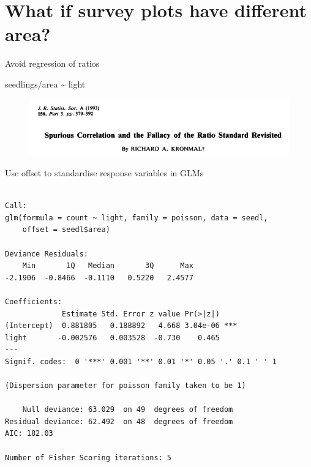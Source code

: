 \documentclass[10pt,ignorenonframetext,]{beamer}
\newenvironment{Shaded}{\begin{snugshade}}{\end{snugshade}}
\newcommand{\KeywordTok}[1]{\textcolor[rgb]{0.13,0.29,0.53}{\textbf{{#1}}}}
\newcommand{\DataTypeTok}[1]{\textcolor[rgb]{0.13,0.29,0.53}{{#1}}}
\newcommand{\StringTok}[1]{\textcolor[rgb]{0.31,0.60,0.02}{{#1}}}
\newcommand{\NormalTok}[1]{{#1}}
\begin{document}
\section{What if survey plots have different
area?}\label{what-if-survey-plots-have-different-area}

\begin{frame}{Avoid regression of ratios}

seedlings/area \textasciitilde{} light

\begin{figure}[htbp]
\centering
\includegraphics{images/ratios.PNG}
\caption{}
\end{figure}

\end{frame}

\begin{frame}[fragile]{Use offset to standardise response variables in
GLMs}

\begin{Shaded}
\end{Shaded}

\begin{verbatim}

Call:
glm(formula = count ~ light, family = poisson, data = seedl, 
    offset = seedl$area)

Deviance Residuals: 
    Min       1Q   Median       3Q      Max  
-2.1906  -0.8466  -0.1110   0.5220   2.4577  

Coefficients:
             Estimate Std. Error z value Pr(>|z|)    
(Intercept)  0.881805   0.188892   4.668 3.04e-06 ***
light       -0.002576   0.003528  -0.730    0.465    
---
Signif. codes:  0 '***' 0.001 '**' 0.01 '*' 0.05 '.' 0.1 ' ' 1

(Dispersion parameter for poisson family taken to be 1)

    Null deviance: 63.029  on 49  degrees of freedom
Residual deviance: 62.492  on 48  degrees of freedom
AIC: 182.03

Number of Fisher Scoring iterations: 5
\end{verbatim}

\end{frame}
\end{document}
